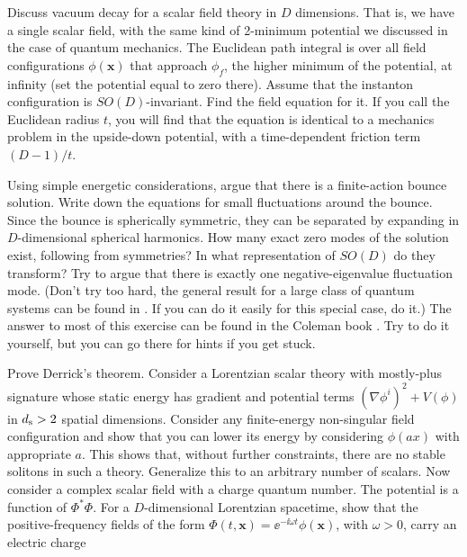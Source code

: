 \begin{banksproblems}

Discuss vacuum decay for a scalar field theory in $D$ dimensions. That is, we
have a single scalar field, with the same kind of 2-minimum potential we
discussed in the case of quantum mechanics. The Euclidean path integral is over
all field configurations $\phi(\mathbf x)$ that approach $\phi_f$, the higher minimum
of the potential, at infinity (set the potential equal to zero there). Assume
that the instanton configuration is $SO(D)$-invariant. Find the field equation
for it. If you call the Euclidean radius $t$, you will find that the equation is
identical to a mechanics problem in the upside-down potential, with a
time-dependent friction term $(D-1)/t$.

Using simple energetic considerations, argue that there is a finite-action
bounce solution. Write down the equations for small fluctuations around the
bounce. Since the bounce is spherically symmetric, they can be separated by
expanding in $D$-dimensional spherical harmonics. How many exact zero modes of
the solution exist, following from symmetries? In what representation of $SO(D)$
do they transform? Try to argue that there is exactly one negative-eigenvalue
fluctuation mode. (Don't try too hard, the general result for a large class of
quantum systems can be found in \cite{banks-ref-151}. If you can do it easily
for this special case, do it.) The answer to most of this exercise can be found
in the Coleman book \cite{banks-ref-138}. Try to do it yourself, but you can go
there for hints if you get stuck.

Prove Derrick's theorem. Consider a Lorentzian scalar theory with mostly-plus
signature whose static energy has gradient and potential terms
$(\nabla\phi^i)^2+V(\phi)$ in $d_{\rm s}>2$ spatial dimensions. Consider any finite-energy non-singular field
configuration and show that you can lower its energy by considering
$\phi(ax)$ with appropriate $a$. This shows that, without further constraints,
there are no stable solitons in such a theory. Generalize this to an arbitrary
number of scalars. Now consider a complex scalar field with a charge quantum
number. The potential is a function of $\Phi^*\Phi$. For a
$D$-dimensional Lorentzian spacetime, show that the positive-frequency fields
of the form $\Phi(t,\mathbf x)=\ee^{-\ii\omega t}\phi(\mathbf x)$, with
$\omega>0$, carry an electric charge


\end{banksproblems}
